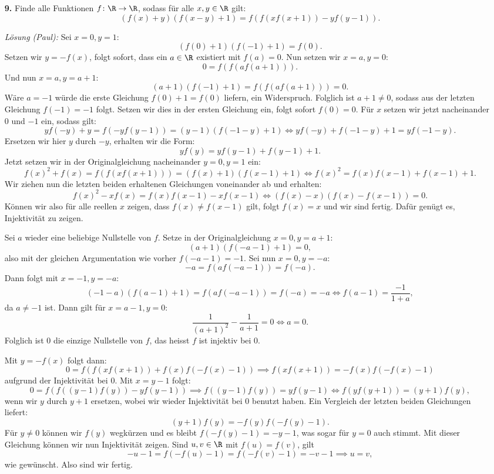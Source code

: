\documentclass[language=german,style=solution]{smo}
\begin{document}
\begin{enumerate}
\newpage

\item[\textbf{9.}] %
Finde alle Funktionen $f\colon \R \to \R$, sodass für alle $x,y\in\R$ gilt:
\[
(f(x)+y)(f(x-y)+1)= f(f(xf(x+1)) - yf(y-1)).
\]

\textit{Lösung (Paul):}
Sei $x = 0, y = 1$:
\[
(f(0) + 1)(f(-1) + 1) = f(0).
\]
Setzen wir $y = -f(x)$, folgt sofort, dass ein $a \in \R$ existiert mit $f(a) = 0$. Nun setzen wir $x = a, y = 0$:
\[
0 = f(f(af(a + 1))).
\]
Und nun $x = a, y = a + 1$:
\[
(a + 1)(f(-1) + 1) = f(f(af(a + 1))) = 0.
\]
Wäre $a = -1$ würde die erste Gleichung $f(0) + 1 = f(0)$ liefern, ein Widerspruch. Folglich ist $a + 1 \neq 0$, sodass aus der letzten Gleichung $f(-1) = -1$ folgt. Setzen wir dies in der ersten Gleichung ein, folgt sofort $f(0) = 0$. Für $x$ setzen wir jetzt nacheinander $0$ und $-1$ ein, sodass gilt:
\[
yf(-y) + y = f(-yf(y-1)) = (y - 1)(f(-1 -y) + 1) \iff yf(-y) + f(-1 - y) + 1 = yf(-1 - y).
\]
Ersetzen wir hier $y$ durch $-y$, erhalten wir die Form:
\[
yf(y) = yf(y - 1) + f(y - 1) + 1.
\]
Jetzt setzen wir in der Originalgleichung nacheinander $y = 0, y = 1$ ein:
\[
f(x)^2 + f(x) = f(f(xf(x + 1))) = (f(x) + 1)(f(x -1) + 1) \iff f(x)^2 = f(x)f(x - 1) + f(x - 1) + 1.
\]
Wir ziehen nun die letzten beiden erhaltenen Gleichungen voneinander ab und erhalten:
\[
f(x)^2 - xf(x) = f(x)f(x - 1) - xf(x-1) \iff (f(x) - x)(f(x) - f(x - 1)) = 0.
\]
Können wir also für alle reellen $x$ zeigen, dass $f(x) \neq f(x - 1)$ gilt, folgt $f(x) = x$ und wir sind fertig. Dafür genügt es, Injektivität zu zeigen.

Sei $a$ wieder eine beliebige Nullstelle von $f$. Setze in der Originalgleichung $x = 0, y = a + 1$:
\[
(a + 1)(f(-a - 1) + 1) = 0,
\]
also mit der gleichen Argumentation wie vorher $f(-a - 1) = -1$. Sei nun $x = 0, y = -a$:
\[
-a = f(af(-a - 1)) = f(-a).
\]
Dann folgt mit $x = -1, y = -a$:
\[
(-1 - a)(f(a - 1) + 1) = f(af(-a - 1)) = f(-a) = -a \iff f(a - 1) = \frac{-1}{1 + a},
\]
da $a \neq -1$ ist. Dann gilt für $x = a - 1, y = 0$:
\[
\frac{1}{(a + 1)^2} - \frac{1}{a + 1} = 0 \iff a = 0.
\]
Folglich ist $0$ die einzige Nullstelle  von $f$, das heisst $f$ ist injektiv bei $0$.

Mit $y = -f(x)$ folgt dann:
\[
0 = f(f(xf(x + 1)) + f(x)f(-f(x) - 1)) \implies f(xf(x + 1)) = -f(x)f(-f(x) - 1)
\]
aufgrund der Injektivität bei $0$. Mit $x = y - 1$ folgt:
\[
0 = f(f((y - 1)f(y)) - yf(y-1)) \implies f((y - 1)f(y)) = yf(y - 1) \iff f(yf(y + 1)) = (y + 1)f(y),
\]
wenn wir $y$ durch $y + 1$ ersetzen, wobei wir wieder Injektivität bei $0$ benutzt haben. Ein Vergleich der letzten beiden Gleichungen liefert:
\[
(y + 1)f(y) = -f(y)f(-f(y) - 1).
\]
Für $y \neq 0$ können wir $f(y)$ wegkürzen und es bleibt $f(-f(y) - 1) = -y - 1$, was sogar für $y = 0$ auch stimmt. Mit dieser Gleichung können wir nun Injektivität zeigen. Sind $u, v \in \R$ mit $f(u) = f(v)$, gilt
\[
-u - 1 = f(-f(u) - 1) = f(-f(v) - 1) = -v - 1 \implies u = v,
\]
wie gewünscht. Also sind wir fertig.


\end{enumerate}
\end{document}
